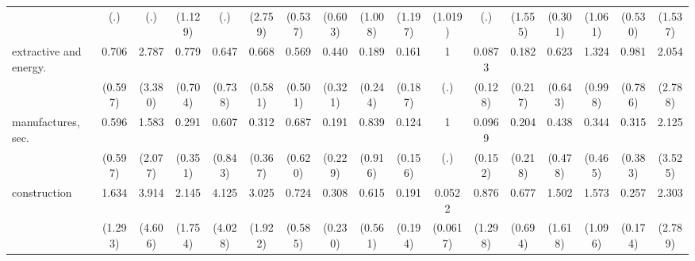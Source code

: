 {\begin{tabular}{l*{16}{c}}
                    &         (.)         &         (.)         &     (1.129)         &         (.)         &     (2.759)         &     (0.537)         &     (0.603)         &     (1.008)         &     (1.197)         &     (1.019)         &         (.)         &     (1.555)         &     (0.301)         &     (1.061)         &     (0.530)         &     (1.537)         \\
[1em]
extractive and energy.&       0.706         &       2.787         &       0.779         &       0.647         &       0.668         &       0.569         &       0.440         &       0.189         &       0.161         &           1         &      0.0873         &       0.182         &       0.623         &       1.324         &       0.981         &       2.054         \\
                    &     (0.597)         &     (3.380)         &     (0.704)         &     (0.738)         &     (0.581)         &     (0.501)         &     (0.321)         &     (0.244)         &     (0.187)         &         (.)         &     (0.128)         &     (0.217)         &     (0.643)         &     (0.998)         &     (0.786)         &     (2.788)         \\
[1em]
manufactures, sec.  &       0.596         &       1.583         &       0.291         &       0.607         &       0.312         &       0.687         &       0.191         &       0.839         &       0.124         &           1         &      0.0969         &       0.204         &       0.438         &       0.344         &       0.315         &       2.125         \\
                    &     (0.597)         &     (2.077)         &     (0.351)         &     (0.843)         &     (0.367)         &     (0.620)         &     (0.229)         &     (0.916)         &     (0.156)         &         (.)         &     (0.152)         &     (0.218)         &     (0.478)         &     (0.465)         &     (0.383)         &     (3.525)         \\
[1em]
construction        &       1.634         &       3.914         &       2.145         &       4.125         &       3.025         &       0.724         &       0.308         &       0.615         &       0.191         &      0.0522\sym{*}  &       0.876         &       0.677         &       1.502         &       1.573         &       0.257\sym{*}  &       2.303         \\
                    &     (1.293)         &     (4.606)         &     (1.754)         &     (4.028)         &     (1.922)         &     (0.585)         &     (0.230)         &     (0.561)         &     (0.194)         &    (0.0617)         &     (1.298)         &     (0.694)         &     (1.618)         &     (1.096)         &     (0.174)         &     (2.789)         \\

\end{tabular}}
